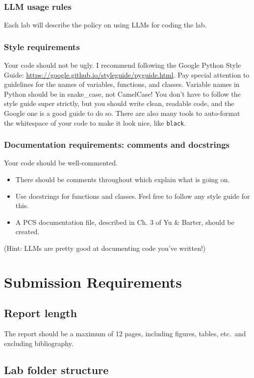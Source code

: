 \documentclass[letterpaper,12pt]{article}
\begin{document}
\subsubsection{LLM usage rules}
Each lab will describe the policy on using LLMs for coding the lab.

\subsubsection{Style requirements}
Your code should not be ugly. I recommend following the Google Python Style Guide: \url{https://google.github.io/styleguide/pyguide.html}. Pay special attention to guidelines for the names of variables, functions, and classes. Variable names in Python should be in snake\_case, not CamelCase! You don't have to follow the style guide super strictly, but you should write clean, readable code, and the Google one is a good guide to do so. There are also many tools to auto-format the whitespace of your code to make it look nice, like \texttt{black}.

\subsubsection{Documentation requirements: comments and docstrings}
Your code should be well-commented.
\begin{itemize}
  \item There should be comments throughout which explain what is going on.
  \item Use docstrings for functions and classes. Feel free to follow any style guide for this.
  \item A PCS documentation file, described in Ch. 3 of Yu \& Barter, should be created.
\end{itemize}
(Hint: LLMs are pretty good at documenting code you've written!)

\section{Submission Requirements}

\subsection{Report length}
The report should be a maximum of 12 pages, including figures, tables, etc.~and excluding bibliography.

\subsection{Lab folder structure}
\end{document}
